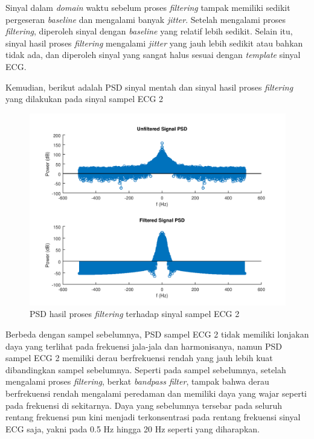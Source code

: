 \documentclass[11pt]{article}
\begin{document}
Sinyal dalam \textit{domain} waktu sebelum proses \textit{filtering} tampak memiliki sedikit pergeseran \textit{baseline} dan mengalami banyak \textit{jitter}. Setelah mengalami proses \textit{filtering}, diperoleh sinyal dengan \textit{baseline} yang relatif lebih sedikit. Selain itu, sinyal hasil proses \textit{filtering} mengalami \textit{jitter} yang jauh lebih sedikit atau bahkan tidak ada, dan diperoleh sinyal yang sangat halus sesuai dengan \textit{template} sinyal ECG.

Kemudian, berikut adalah PSD sinyal mentah dan sinyal hasil proses \textit{filtering} yang dilakukan pada sinyal sampel ECG 2

\begin{figure}[H]
\centerline{\includegraphics[scale=0.55]{figures/fig23-ecg2filteredpsd.png}}
\caption{PSD hasil proses \textit{filtering} terhadap sinyal sampel ECG 2}
\label{ecg2filteredpsd}
\end{figure}

Berbeda dengan sampel sebelumnya, PSD sampel ECG 2 tidak memiliki lonjakan daya yang terlihat pada frekuensi jala-jala dan harmonisanya, namun PSD sampel ECG 2 memiliki derau berfrekuensi rendah yang jauh lebih kuat dibandingkan sampel sebelumnya. Seperti pada sampel sebelumnya, setelah mengalami proses \textit{filtering}, berkat \textit{bandpass filter}, tampak bahwa derau berfrekuensi rendah mengalami peredaman dan memiliki daya yang wajar seperti pada frekuensi di sekitarnya. Daya yang sebelumnya tersebar pada seluruh rentang frekuensi pun kini menjadi terkonsentrasi pada rentang frekuensi sinyal ECG saja, yakni pada 0.5 Hz hingga 20 Hz seperti yang diharapkan. 
\end{document}
